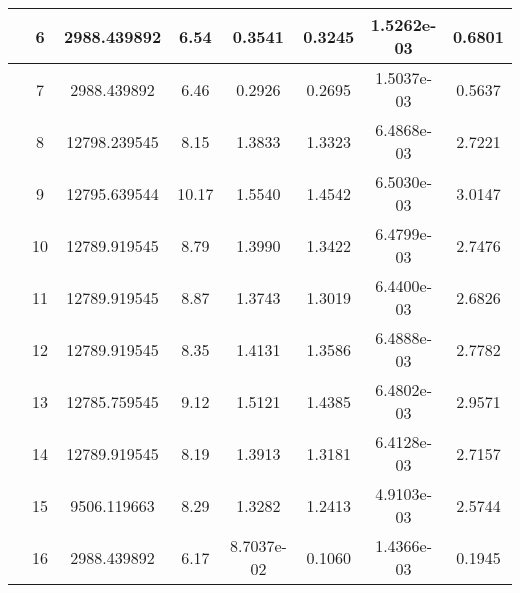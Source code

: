 \documentclass[12pt]{amsart}
\begin{document}
\begin{tabular}{|c|c|c|c|c|c|c|c|}
 & 6 &   2988.439892 &   6.54 &   0.3541 & 0.3245 &   1.5262e-03 & 0.6801 \\\hline
 & 7 &   2988.439892 &   6.46 &   0.2926 & 0.2695 &   1.5037e-03 & 0.5637 \\\hline
 & 8 &  12798.239545 &   8.15 &   1.3833 & 1.3323 &   6.4868e-03 & 2.7221 \\\hline
 & 9 &  12795.639544 &    10.17 &   1.5540 & 1.4542 &   6.5030e-03 & 3.0147 \\\hline
 & 10 &  12789.919545 &   8.79 &   1.3990 & 1.3422 &   6.4799e-03 & 2.7476 \\\hline
 & 11 &  12789.919545 &   8.87 &   1.3743 & 1.3019 &   6.4400e-03 & 2.6826 \\\hline
 & 12 & 12789.919545 & 8.35 & 1.4131 & 1.3586 & 6.4888e-03 & 2.7782 \\\hline
 & 13 & 12785.759545 & 9.12 & 1.5121 & 1.4385 & 6.4802e-03 & 2.9571 \\\hline
 & 14 & 12789.919545 & 8.19 & 1.3913 & 1.3181 & 6.4128e-03 & 2.7157 \\\hline
 & 15 & 9506.119663 & 8.29 & 1.3282 & 1.2413 & 4.9103e-03 & 2.5744 \\\hline
 & 16 & 2988.439892 & 6.17 & 8.7037e-02 & 0.1060 & 1.4366e-03 & 0.1945 \\\hline
\end{tabular}
\end{document}
